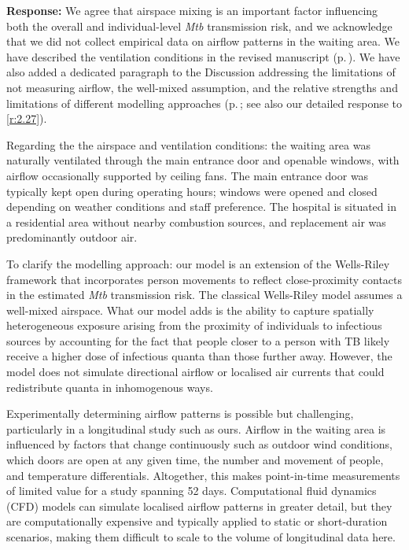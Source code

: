 \documentclass[11pt]{article}
\newcommand{\response}[1]{\textbf{Response:} #1}
\begin{document}
\begin{enumerate}[label=\textbf{R2.\arabic*.}, leftmargin=*]
\response{We agree that airspace mixing is an important factor influencing both the overall and individual-level \emph{Mtb} transmission risk, and we acknowledge that we did not collect empirical data on airflow patterns in the waiting area. We have described the ventilation conditions in the revised manuscript (p.\,\pageref{chg:R2.3vent}). We have also added a dedicated paragraph to the Discussion addressing the limitations of not measuring airflow, the well-mixed assumption, and the relative strengths and limitations of different modelling approaches (p.\,\pageref{chg:R2.27}; see also our detailed response to \ref{r:2.27}).

Regarding the the airspace and ventilation conditions: the waiting area was naturally ventilated through the main entrance door and openable windows, with airflow occasionally supported by ceiling fans. The main entrance door was typically kept open during operating hours; windows were opened and closed depending on weather conditions and staff preference. The hospital is situated in a residential area without nearby combustion sources, and replacement air was predominantly outdoor air. 

To clarify the modelling approach: our model is an extension of the Wells-Riley framework that incorporates person movements to reflect close-proximity contacts in the estimated \emph{Mtb} transmission risk. The classical Wells-Riley model assumes a well-mixed airspace. What our model adds is the ability to capture spatially heterogeneous exposure arising from the proximity of individuals to infectious sources by accounting for the fact that people closer to a person with TB likely receive a higher dose of infectious quanta than those further away. However, the model does not simulate directional airflow or localised air currents that could redistribute quanta in inhomogenous ways.

Experimentally determining airflow patterns is possible but challenging, particularly in a longitudinal study such as ours. Airflow in the waiting area is influenced by factors that change continuously such as outdoor wind conditions, which doors are open at any given time, the number and movement of people, and temperature differentials. Altogether, this makes point-in-time measurements of limited value for a study spanning 52 days. Computational fluid dynamics (CFD) models can simulate localised airflow patterns in greater detail, but they are computationally expensive and typically applied to static or short-duration scenarios, making them difficult to scale to the volume of longitudinal data here. 

}
\end{enumerate}
\end{document}
